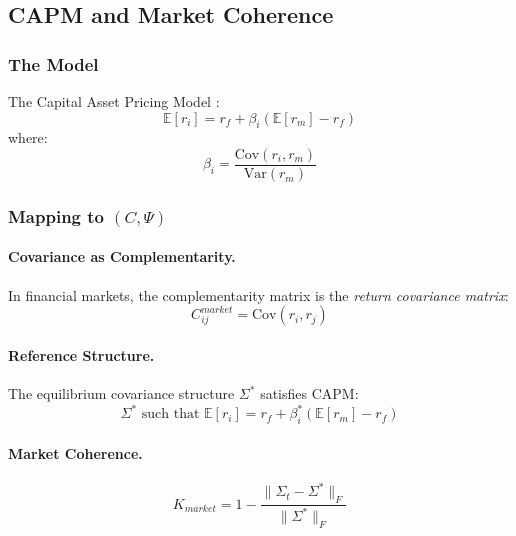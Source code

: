 \subsection{CAPM and Market Coherence}
\label{app:capm}

\subsubsection{The Model}

The Capital Asset Pricing Model \citep{sharpe1964,lintner1965}:
\begin{equation}
  \mathbb{E}[r_i] = r_f + \beta_i (\mathbb{E}[r_m] - r_f)
  \label{eq:capm}
\end{equation}
where:
\begin{equation}
  \beta_i = \frac{\text{Cov}(r_i, r_m)}{\text{Var}(r_m)}
\end{equation}

\subsubsection{Mapping to $(C, \Psi)$}

\paragraph{Covariance as Complementarity.}
In financial markets, the complementarity matrix is the \emph{return covariance matrix}:
\begin{equation}
  C^{market}_{ij} = \text{Cov}(r_i, r_j)
\end{equation}

\paragraph{Reference Structure.}
The equilibrium covariance structure $\Sigma^*$ satisfies CAPM:
\begin{equation}
  \Sigma^* \text{ such that } \mathbb{E}[r_i] = r_f + \beta_i^* (\mathbb{E}[r_m] - r_f)
\end{equation}

\paragraph{Market Coherence.}
\begin{equation}
  K_{market} = 1 - \frac{\|\Sigma_t - \Sigma^*\|_F}{\|\Sigma^*\|_F}
\end{equation}

